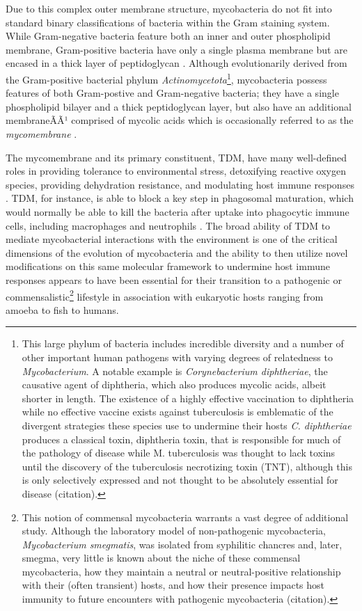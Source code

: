Due to this complex outer membrane structure, mycobacteria do not fit into standard binary classifications of bacteria within the Gram staining system. While Gram-negative bacteria feature both an inner and outer phospholipid membrane, Gram-positive bacteria have only a single plasma membrane but are encased in a thick layer of peptidoglycan \citep{Carlone1982, Salton1953}. Although evolutionarily derived from the Gram-positive bacterial phylum \textit{Actinomycetota}\footnote{This large phylum of bacteria includes incredible diversity and a number of other important human pathogens with varying degrees of relatedness to \textit{Mycobacterium}. A notable example is \textit{Corynebacterium diphtheriae}, the causative agent of diphtheria, which also produces mycolic acids, albeit shorter in length. The existence of a highly effective vaccination to diphtheria while no effective vaccine exists against tuberculosis is emblematic of the divergent strategies these species use to undermine their hosts \textit{C. diphtheriae} produces a classical toxin, diphtheria toxin, that is responsible for much of the pathology of disease while M. tuberculosis was thought to lack toxins until the discovery of the tuberculosis necrotizing toxin (TNT), although this is only selectively expressed and not thought to be absolutely essential for disease (citation).}, mycobacteria possess features of both Gram-postive and Gram-negative bacteria; they have a single phospholipid bilayer and a thick peptidoglycan layer, but also have an additional membraneÃÃ¹ comprised of mycolic acids which is occasionally referred to as the \textit{mycomembrane} \citep{Jankute2015, Brennan2003,  Brennan1995, Chatterjee1997}.

The mycomembrane and its primary constituent, TDM, have many well-defined roles in providing tolerance to environmental stress, detoxifying reactive oxygen species, providing dehydration resistance, and modulating host immune responses \citep{Lima2001, Ryll2001, Harland2008, Patin2017b}. TDM, for instance, is able to block a key step in phagosomal maturation, which would normally be able to kill the bacteria after uptake into phagocytic immune cells, including macrophages and neutrophils \citep{Axelrod2008, Indrigo2003, Spargo1991}. The broad ability of TDM to mediate mycobacterial interactions with the environment is one of the critical dimensions of the evolution of mycobacteria and the ability to then utilize novel modifications on this same molecular framework to undermine host immune responses appears to have been essential for their transition to a pathogenic or commensalistic\footnote{This notion of commensal mycobacteria warrants a vast degree of additional study. Although the laboratory model of non-pathogenic mycobacteria, \textit{Mycobacterium smegmatis}, was isolated from syphilitic chancres and, later, smegma, very little is known about the niche of these commensal mycobacteria, how they maintain a neutral or neutral-positive relationship with their (often transient) hosts, and how their presence impacts host immunity to future encounters with pathogenic mycobacteria (citation).} lifestyle in association with eukaryotic hosts ranging from amoeba to fish to humans.

